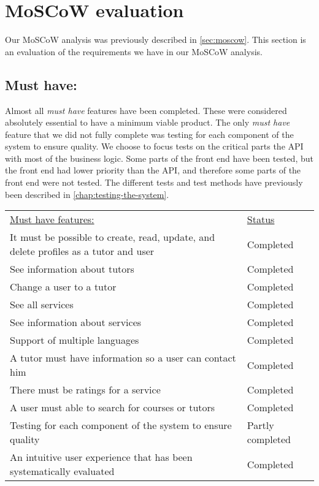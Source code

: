 \section{MoSCoW evaluation}
Our MoSCoW analysis was previously described in \autoref{sec:moscow}.
This section is an evaluation of the requirements we have in our MoSCoW analysis.

\subsection{Must have:}
Almost all \textit{must have} features have been completed.
These were considered absolutely essential to have a minimum viable product. 
The only \textit{must have} feature that we did not fully complete was testing for each component of the system to ensure quality.
We choose to focus tests on the critical parts the API with most of the business logic. 
Some parts of the front end have been tested, but the front end had lower priority than the API, and therefore some parts of the front end were not tested. 
The different tests and test methods have previously been described in \autoref{chap:testing-the-system}.
\begin{table}[h]
    \begin{tabularx}{\textwidth}{|X|l|}
    \underline{Must have features:}                                                                   & \underline{Status} \\
    It must be possible to create, read, update, and delete profiles as a tutor and user              & Completed \\
    See information about tutors                                                                      & Completed \\
    Change a user to a tutor                                                                          & Completed \\
    See all services                                                                                  & Completed \\
    See information about services                                                                    & Completed \\
    Support of multiple languages                                                                     & Completed \\
    A tutor must have information so a user can contact him                                           & Completed \\
    There must be ratings for a service                                                                 & Completed \\
    A user must able to search for courses or tutors                                                  & Completed \\
    Testing for each component of the system to ensure quality                                        & Partly completed \\
    An intuitive user experience that has been systematically evaluated                               & Completed \\
    \end{tabularx}
\end{table}

